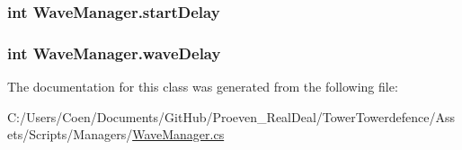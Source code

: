 \subsubsection[{\texorpdfstring{start\+Delay}{startDelay}}]{\setlength{\rightskip}{0pt plus 5cm}int Wave\+Manager.\+start\+Delay}\hypertarget{class_wave_manager_a32df995055f87d3815f1c1e914408e2a}{}\label{class_wave_manager_a32df995055f87d3815f1c1e914408e2a}
\subsubsection[{\texorpdfstring{wave\+Delay}{waveDelay}}]{\setlength{\rightskip}{0pt plus 5cm}int Wave\+Manager.\+wave\+Delay}\hypertarget{class_wave_manager_a617dc857368276636bf84a66a5168a64}{}\label{class_wave_manager_a617dc857368276636bf84a66a5168a64}


The documentation for this class was generated from the following file\+:\begin{DoxyCompactItemize}
\item 
C\+:/\+Users/\+Coen/\+Documents/\+Git\+Hub/\+Proeven\+\_\+\+Real\+Deal/\+Tower\+Towerdefence/\+Assets/\+Scripts/\+Managers/\hyperlink{_wave_manager_8cs}{Wave\+Manager.\+cs}\end{DoxyCompactItemize}
